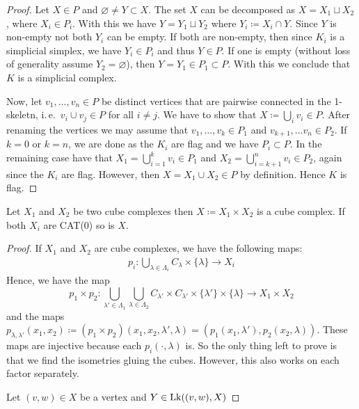 \begin{proof}
  Let \(X \in P\) and \(\varnothing \neq Y \subset X\). The set \(X\) can be decomposed as \(X = X_1 \sqcup X_2\), where \(X_i \in P_i\). With this we have \(Y = Y_1 \sqcup Y_2\) where \(Y_i \coloneqq X_i \cap Y\). Since \(Y\) is non-empty not both \(Y_i\) can be empty. If both are non-empty, then since \(K_i\) is a simplicial simplex, we have \(Y_i \in P_i\) and thus \(Y \in P\). If one is empty (without loss of generality assume \(Y_2 = \varnothing\)), then \(Y = Y_1 \in P_1 \subset P\). With this we conclude that \(K\) is a simplicial complex.

  Now, let \(v_1, \dots, v_n \in P\) be distinct vertices that are pairwise connected in the 1-skeletn, i.\,e.\ \(v_i \cup v_j \in P\) for all \(i \neq j\). We have to show that \(X \coloneqq \bigcup_i v_i \in P\). After renaming the vertices we may assume that \(v_1, \dots, v_k \in P_1\) and \(v_{k+1}, \dots v_{n} \in P_2\). If \(k=0\) or \(k=n\), we are done as the \(K_i\) are flag and we have \(P_i \subset P\). In the remaining case have that \(X_1 = \bigcup_{i=1}^kv_i \in P_1\) and \(X_2 = \bigcup_{i=k+1}^n v_i \in P_2\), again since the \(K_i\) are flag. However, then \(X = X_1 \cup X_2 \in P\) by definition. Hence \(K\) is flag.
\end{proof}

\begin{prop}
  \label{prop:product-cat}
  Let \(X_1\) and \(X_2\) be two cube complexes then \(X \coloneqq X_1 \times X_2\) is a cube complex. If both \(X_i\) are CAT(0) so is \(X\).
\end{prop}

\begin{proof}
  If \(X_1\) and \(X_2\) are cube complexes, we have the following maps:
  \begin{align*}
    p_i \colon \bigcup_{\lambda \in \Lambda_i} C_\lambda \times \{\lambda\} \to X_i
  \end{align*}
  Hence, we have the map
  \[
    p_1 \times p_2 \colon \bigcup_{\lambda' \in \Lambda_1} \bigcup_{\lambda \in \Lambda_2} C_{\lambda'} \times C_{\lambda'} \times \{\lambda'\} \times \{\lambda\} \to X_1 \times X_2
  \]
  and the maps \(p_{\lambda, \lambda'}(x_1,x_2) \coloneqq (p_1 \times p_2)(x_1, x_2, \lambda', \lambda) = (p_1(x_1, \lambda'), p_2(x_2, \lambda))\). These maps are injective because each \(p_i(\cdot, \lambda)\) is. So the only thing left to prove is that we find the isometries gluing the cubes. However, this also works on each factor separately.

  Let \((v,w) \in X\) be a vertex and \(Y \in \operatorname{Lk}((v,w), X)\) 
\end{proof}

